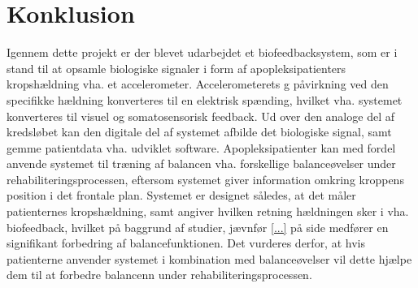 \section{Konklusion}
Igennem dette projekt er der blevet udarbejdet et biofeedbacksystem, som er i stand til at opsamle biologiske signaler i form af apopleksipatienters kropshældning vha. et accelerometer. Accelerometerets g påvirkning ved den specifikke hældning konverteres til en elektrisk spænding, hvilket vha. systemet konverteres til visuel og somatosensorisk feedback. Ud over den analoge del af kredsløbet kan den digitale del af systemet afbilde det biologiske signal, samt gemme patientdata vha. udviklet software. Apopleksipatienter kan med fordel anvende systemet til træning af balancen vha. forskellige balanceøvelser under rehabiliteringsprocessen, eftersom systemet giver information omkring kroppens position i det frontale plan. Systemet er designet således, at det måler patienternes kropshældning, samt angiver hvilken retning hældningen sker i vha. biofeedback, hvilket på baggrund af studier, jævnfør \ref{...} på side \pageref{...} medfører en signifikant forbedring af balancefunktionen. Det vurderes derfor, at hvis patienterne anvender systemet i kombination med balanceøvelser vil dette hjælpe dem til at forbedre balancenn under rehabiliteringsprocessen.  

